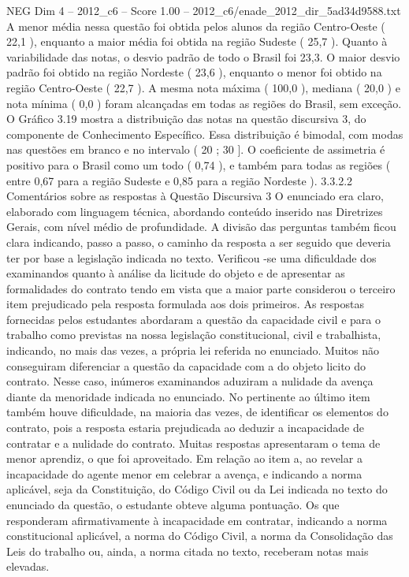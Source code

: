 \begin{textsample}{NEG Dim 4 – 2012\_c6 – Score 1.00 – 2012\_c6/enade\_2012\_dir\_5ad34d9588.txt}
A menor média nessa questão foi obtida pelos alunos da região Centro-Oeste ( 22,1 ), enquanto a maior média foi obtida na região Sudeste ( 25,7 ).
Quanto à variabilidade das notas, o desvio padrão de todo o Brasil foi 23,3.
O maior desvio padrão foi obtido na região Nordeste ( 23,6 ), enquanto o menor foi obtido na região Centro-Oeste ( 22,7 ).
A mesma nota máxima ( 100,0 ), mediana ( 20,0 ) e nota mínima ( 0,0 ) foram alcançadas em todas as regiões do Brasil, sem exceção.
O Gráfico 3.19 mostra a distribuição das notas na questão discursiva 3, do componente de Conhecimento Específico.
Essa distribuição é bimodal, com modas nas questões em branco e no intervalo ( 20 ; 30 ].
O coeficiente de assimetria é positivo para o Brasil como um todo ( 0,74 ), e também para todas as regiões ( entre 0,67 para a região Sudeste e 0,85 para a região Nordeste ). 3.3.2.2 Comentários sobre as respostas à Questão Discursiva 3 O enunciado era claro, elaborado com linguagem técnica, abordando conteúdo inserido nas Diretrizes Gerais, com nível médio de profundidade.
A divisão das perguntas também ficou clara indicando, passo a passo, o caminho da resposta a ser seguido que deveria ter por base a legislação indicada no texto.
Verificou -se uma dificuldade dos examinandos quanto à análise da licitude do objeto e de apresentar as formalidades do contrato tendo em vista que a maior parte considerou o terceiro item prejudicado pela resposta formulada aos dois primeiros.
As respostas fornecidas pelos estudantes abordaram a questão da capacidade civil e para o trabalho como previstas na nossa legislação constitucional, civil e trabalhista, indicando, no mais das vezes, a própria lei referida no enunciado.
Muitos não conseguiram diferenciar a questão da capacidade com a do objeto licito do contrato.
Nesse caso, inúmeros examinandos aduziram a nulidade da avença diante da menoridade indicada no enunciado.
No pertinente ao último item também houve dificuldade, na maioria das vezes, de identificar os elementos do contrato, pois a resposta estaria prejudicada ao deduzir a incapacidade de contratar e a nulidade do contrato.
Muitas respostas apresentaram o tema de menor aprendiz, o que foi aproveitado.
Em relação ao item a, ao revelar a incapacidade do agente menor em celebrar a avença, e indicando a norma aplicável, seja da Constituição, do Código Civil ou da Lei indicada no texto do enunciado da questão, o estudante obteve alguma pontuação.
Os que responderam afirmativamente à incapacidade em contratar, indicando a norma constitucional aplicável, a norma do Código Civil, a norma da Consolidação das Leis do trabalho ou, ainda, a norma citada no texto, receberam notas mais elevadas.

\end{textsample}
